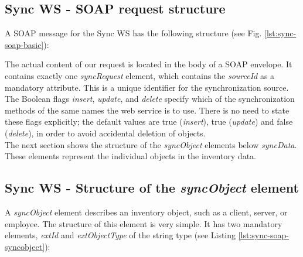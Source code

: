 \documentclass[a4paper,10pt]{book}
\begin{document}
\subsection{Sync WS - SOAP request structure}
A SOAP message for the Sync WS has the following structure (see Fig. \ref{lst:sync-soap-basic}):
\newline

\lstset{language=XML}


The actual content of our request is located in the body of a SOAP envelope. It contains exactly one
\textit{syncRequest} element, which contains the \textit{sourceId} as a mandatory attribute.
This is a unique identifier for the synchronization source. The Boolean flags \textit{insert}, \textit{update},
and \textit{delete} specify which of the synchronization methods of the same names the web service is to use.
There is no need to state these flags explicitly; the default values are true (\textit{insert}), true (\textit{update}) and
false (\textit{delete}), in order to avoid accidental deletion of objects.
\newline\\
The next section shows the structure of the \textit{syncObject} elements below \textit{syncData}.
These elements represent the individual objects in the inventory data.

\subsection{Sync WS - Structure of the \textit{syncObject} element}
A \textit{syncObject} element describes an inventory object, such as a client, server, or employee. The structure
of this element is very simple. It has two mandatory elements, \textit{extId}
and \textit{extObjectType} of the string type (see Listing \ref{lst:sync-soap-syncobject}):

\lstset{language=XML}

\end{document}
